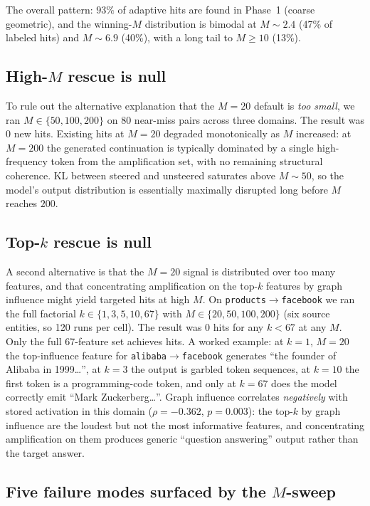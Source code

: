 The overall pattern: $93\%$ of adaptive hits are found in Phase~1 (coarse geometric), and the winning-$M$ distribution is bimodal at $M\sim 2.4$ (47\% of labeled hits) and $M\sim 6.9$ (40\%), with a long tail to $M \geq 10$ (13\%).

\subsection{High-$M$ rescue is null}

To rule out the alternative explanation that the $M{=}20$ default is \emph{too small}, we ran $M \in \{50, 100, 200\}$ on 80 near-miss pairs across three domains. The result was $0$ new hits. Existing hits at $M{=}20$ degraded monotonically as $M$ increased: at $M{=}200$ the generated continuation is typically dominated by a single high-frequency token from the amplification set, with no remaining structural coherence. KL between steered and unsteered saturates above $M\sim 50$, so the model's output distribution is essentially maximally disrupted long before $M$ reaches $200$.

\subsection{Top-$k$ rescue is null}

A second alternative is that the $M{=}20$ signal is distributed over too many features, and that concentrating amplification on the top-$k$ features by graph influence might yield targeted hits at high $M$. On \texttt{products$\to$facebook} we ran the full factorial $k \in \{1, 3, 5, 10, 67\}$ with $M \in \{20, 50, 100, 200\}$ (six source entities, so 120 runs per cell). The result was $0$ hits for any $k < 67$ at any $M$. Only the full 67-feature set achieves hits. A worked example: at $k{=}1$, $M{=}20$ the top-influence feature for \texttt{alibaba$\to$facebook} generates ``the founder of Alibaba in 1999\ldots'', at $k{=}3$ the output is garbled token sequences, at $k{=}10$ the first token is a programming-code token, and only at $k{=}67$ does the model correctly emit ``Mark Zuckerberg\ldots''. Graph influence correlates \emph{negatively} with stored activation in this domain ($\rho{=}-0.362$, $p{=}0.003$): the top-$k$ by graph influence are the loudest but not the most informative features, and concentrating amplification on them produces generic ``question answering'' output rather than the target answer.

\subsection{Five failure modes surfaced by the $M$-sweep}

